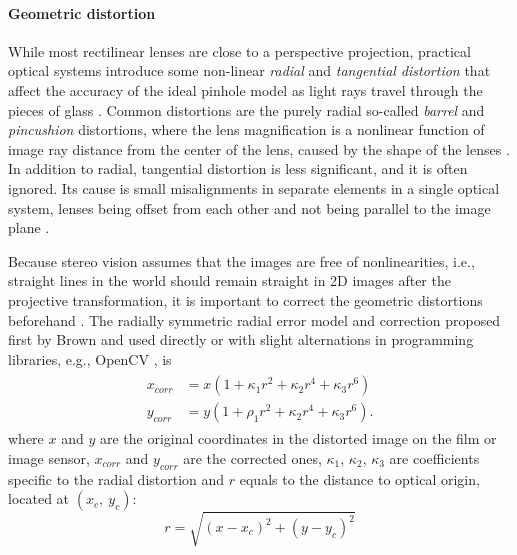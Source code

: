 \paragraph{Geometric distortion}
While most rectilinear lenses are close to a perspective projection, practical optical systems introduce some non-linear \emph{radial} and \emph{tangential distortion} that affect the accuracy of the ideal pinhole model as light rays travel through the pieces of glass \cite{brown1966decentering,brown1971close}.
Common distortions are the purely radial so-called \emph{barrel} and \emph{pincushion} distortions, where the lens magnification is a nonlinear function of image ray distance from the center of the lens, caused by the shape of the lenses \cite{brown1966decentering,brown1971close}.
In addition to radial, tangential distortion is less significant, and it is often ignored.
Its cause is small misalignments in separate elements in a single optical system, lenses being offset from each other and not being parallel to the image plane \cite{brown1966decentering,kingslake1989history}.


Because stereo vision assumes that the images are free of nonlinearities, i.e., straight lines in the world should remain straight in 2D images after the projective transformation, it is important to correct the geometric distortions beforehand \cite{szeliski10vision}.
The radially symmetric radial error model and correction proposed first by Brown \cite{brown1971close,brown1966decentering} and used directly or with slight alternations in programming libraries, e.g., OpenCV \cite{opencv}, is
\begin{align} \label{eq:radialdist} \begin{split}
	x_{corr} &= x(1 + \kappa_1 r^2 + \kappa_2 r^4 + \kappa_3 r^6)\\
	y_{corr} &= y(1 + \rho_1 r^2 + \kappa_2 r^4 + \kappa_3 r^6).
\end{split} \end{align}
where $x$ and $y$ are the original coordinates in the distorted image on the film or image sensor, $x_{corr}$ and $y_{corr}$ are the corrected ones, $\kappa_1$, $\kappa_2$, $\kappa_3$ are coefficients specific to the radial distortion and $r$ equals to the distance to optical origin, located at $(x_c,~y_c)$:
\begin{equation}
r = \sqrt{(x - x_c)^2 + (y - y_c)^2}
\end{equation}

